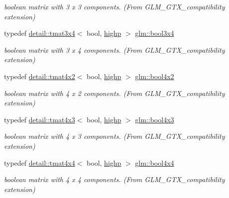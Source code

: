 \begin{DoxyCompactItemize}
\begin{DoxyCompactList}\small\item\em boolean matrix with 3 x 3 components. (From G\+L\+M\+\_\+\+G\+T\+X\+\_\+compatibility extension) \end{DoxyCompactList}\item 
typedef \hyperlink{structglm_1_1detail_1_1tmat3x4}{detail\+::tmat3x4}$<$ bool, \hyperlink{namespaceglm_a0f04f086094c747d227af4425893f545ac6f7eab42eacbb10d59a58e95e362074}{highp} $>$ \hyperlink{group__gtx__compatibility_gaf68d62e1c790fa3f09ef5e866af690f1}{glm\+::bool3x4}
\begin{DoxyCompactList}\small\item\em boolean matrix with 3 x 4 components. (From G\+L\+M\+\_\+\+G\+T\+X\+\_\+compatibility extension) \end{DoxyCompactList}\item 
typedef \hyperlink{structglm_1_1detail_1_1tmat4x2}{detail\+::tmat4x2}$<$ bool, \hyperlink{namespaceglm_a0f04f086094c747d227af4425893f545ac6f7eab42eacbb10d59a58e95e362074}{highp} $>$ \hyperlink{group__gtx__compatibility_gaa431c2e87e8d78c4780c938a9483d6ff}{glm\+::bool4x2}
\begin{DoxyCompactList}\small\item\em boolean matrix with 4 x 2 components. (From G\+L\+M\+\_\+\+G\+T\+X\+\_\+compatibility extension) \end{DoxyCompactList}\item 
typedef \hyperlink{structglm_1_1detail_1_1tmat4x3}{detail\+::tmat4x3}$<$ bool, \hyperlink{namespaceglm_a0f04f086094c747d227af4425893f545ac6f7eab42eacbb10d59a58e95e362074}{highp} $>$ \hyperlink{group__gtx__compatibility_ga7acb207ab877c53dc5751752e1f70053}{glm\+::bool4x3}
\begin{DoxyCompactList}\small\item\em boolean matrix with 4 x 3 components. (From G\+L\+M\+\_\+\+G\+T\+X\+\_\+compatibility extension) \end{DoxyCompactList}\item 
typedef \hyperlink{structglm_1_1detail_1_1tmat4x4}{detail\+::tmat4x4}$<$ bool, \hyperlink{namespaceglm_a0f04f086094c747d227af4425893f545ac6f7eab42eacbb10d59a58e95e362074}{highp} $>$ \hyperlink{group__gtx__compatibility_ga4738dad3625bfa64ddf218897da020e9}{glm\+::bool4x4}
\begin{DoxyCompactList}\small\item\em boolean matrix with 4 x 4 components. (From G\+L\+M\+\_\+\+G\+T\+X\+\_\+compatibility extension) \end{DoxyCompactList}\item 

\end{DoxyCompactItemize}
